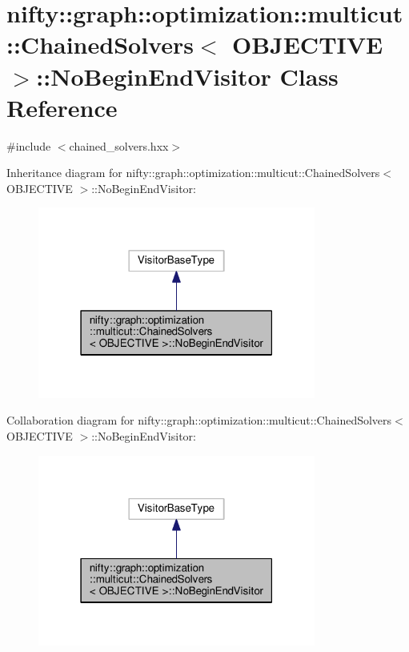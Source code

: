 \hypertarget{classnifty_1_1graph_1_1optimization_1_1multicut_1_1ChainedSolvers_1_1NoBeginEndVisitor}{}\section{nifty\+:\+:graph\+:\+:optimization\+:\+:multicut\+:\+:Chained\+Solvers$<$ O\+B\+J\+E\+C\+T\+I\+V\+E $>$\+:\+:No\+Begin\+End\+Visitor Class Reference}
\label{classnifty_1_1graph_1_1optimization_1_1multicut_1_1ChainedSolvers_1_1NoBeginEndVisitor}


{\ttfamily \#include $<$chained\+\_\+solvers.\+hxx$>$}



Inheritance diagram for nifty\+:\+:graph\+:\+:optimization\+:\+:multicut\+:\+:Chained\+Solvers$<$ O\+B\+J\+E\+C\+T\+I\+V\+E $>$\+:\+:No\+Begin\+End\+Visitor\+:\nopagebreak
\begin{figure}[H]
\begin{center}
\leavevmode
\includegraphics[width=259pt]{classnifty_1_1graph_1_1optimization_1_1multicut_1_1ChainedSolvers_1_1NoBeginEndVisitor__inherit__graph}
\end{center}
\end{figure}


Collaboration diagram for nifty\+:\+:graph\+:\+:optimization\+:\+:multicut\+:\+:Chained\+Solvers$<$ O\+B\+J\+E\+C\+T\+I\+V\+E $>$\+:\+:No\+Begin\+End\+Visitor\+:\nopagebreak
\begin{figure}[H]
\begin{center}
\leavevmode
\includegraphics[width=259pt]{classnifty_1_1graph_1_1optimization_1_1multicut_1_1ChainedSolvers_1_1NoBeginEndVisitor__coll__graph}
\end{center}
\end{figure}

